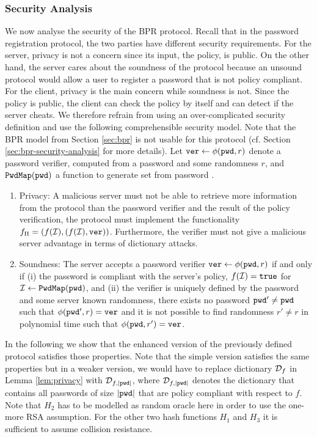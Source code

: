 \subsubsection{Security Analysis} \label{sec:bpr:security}
We now analyse the security of the \ac{BPR} protocol. 
Recall that in the password registration protocol, the two parties have different security requirements. For the server, privacy is not a concern since its input, the policy, is public. 
On the other hand, the server cares about the soundness of the protocol because an unsound protocol would allow a user to register a password that is not policy compliant. 
For the client, privacy is the main concern while soundness is not. Since the policy is public, the client can check the policy by itself and can detect if the server cheats. 
We therefore refrain from using an over-complicated security definition and use the following comprehensible security model.
Note that the \ac{BPR} model from Section \ref{sec:bpr} is not usable for this protocol (cf. Section \ref{sec:bpr-security-analysis} for more details).
Let $\mathtt{ver}\gets\phi(\mathtt{pwd},r)$ denote a password verifier, computed from a password \pwd and some randomness $r$, and $\mathtt{PwdMap}(\mathtt{pwd})$ a function to generate set \ClientSet from password \pwd.
\begin{enumerate}
  \item Privacy: A malicious server must not be able to retrieve more information from the protocol than the password verifier and the result of the policy verification, \ie the protocol must implement the functionality $f_{\Pi}=(f(\mathcal{I}), (f(\mathcal{I}), \mathtt{ver}))$. Furthermore, the verifier must not give a malicious server advantage in terms of dictionary attacks. 
  
  \item Soundness: The server accepts a password verifier $\mathtt{ver}\gets\phi(\mathtt{pwd},r)$ if and only if (i) the password is compliant with the server's policy, \ie $f(\mathcal{I})=\mathtt{true}$ for $\mathcal{I}\gets\mathtt{PwdMap}(\mathtt{pwd})$, and (ii) the verifier is uniquely defined by the password and some server known randomness, \ie there exists no password $\mathtt{pwd}'\not=\mathtt{pwd}$ such that $\phi(\mathtt{pwd}',r)=\mathtt{ver}$ and it is not possible to find randomness $r'\not=r$ in polynomial time such that $\phi(\mathtt{pwd},r')=\mathtt{ver}$.
\end{enumerate}

\noindent
In the following we show that the enhanced version of the previously defined protocol satisfies those properties.
Note that the simple version satisfies the same properties but in a weaker version, \ie we would have to replace dictionary $\mathcal{D}_f$ in Lemma \ref{lem:privacy} with $\mathcal{D}_{f,|\mathtt{pwd}|}$, where $\mathcal{D}_{f,|\mathtt{pwd}|}$ denotes the dictionary that contains all passwords of size $|\mathtt{pwd}|$ that are policy compliant with respect to $f$.
Note that $H_2$ has to be modelled as random oracle here in order to use the one-more RSA assumption.
For the other two hash functions $H_1$ and $H_3$ it is sufficient to assume collision resistance.

